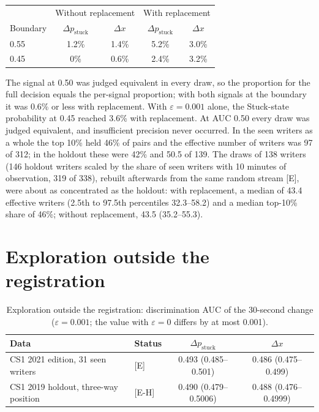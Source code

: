 \begin{center}\small
\begin{tabular}{l c c c c}
  \toprule
  & \multicolumn{2}{c}{Without replacement} & \multicolumn{2}{c}{With replacement} \\
  Boundary & $\Delta p_{\mathrm{stuck}}$ & $\Delta x$ & $\Delta p_{\mathrm{stuck}}$ & $\Delta x$ \\
  \midrule
  0.55 & 1.2\% & 1.4\% & 5.2\% & 3.0\% \\
  0.45 & 0\% & 0.6\% & 2.4\% & 3.2\% \\
  \bottomrule
\end{tabular}
\end{center}

The signal at 0.50 was judged equivalent in every draw, so the proportion for the full decision equals the per-signal
proportion; with both signals at the boundary it was 0.6\% or less with replacement. With $\varepsilon = 0.001$ alone,
the Stuck-state probability at 0.45 reached 3.6\% with replacement. At AUC 0.50 every draw was judged equivalent, and
insufficient precision never occurred. In the seen writers as a whole the top 10\% held 46\% of pairs and the effective number of
writers was 97 of 312; in the holdout these were 42\% and 50.5 of 139. The draws of 138 writers (146 holdout writers scaled by the share of seen writers with 10 minutes of observation,
319 of 338), rebuilt afterwards from
the same random stream [E], were about as concentrated as the holdout: with replacement, a median of 43.4 effective
writers (2.5th to 97.5th percentiles 32.3--58.2) and a median top-10\% share of 46\%; without replacement, 43.5
(35.2--55.3).

\section{Exploration outside the registration}
\label{app:explore}

\begin{table}
  \caption{Exploration outside the registration: discrimination AUC of the 30-second change ($\varepsilon = 0.001$; the
  value with $\varepsilon = 0$ differs by at most 0.001).}
  \label{tab:explore}
  \centering\small
  \begin{tabularx}{\linewidth}{>{\raggedright\arraybackslash}X l c c}
    \toprule
    Data & Status & $\Delta p_{\mathrm{stuck}}$ & $\Delta x$ \\
    \midrule
    CS1 2021 edition, 31 seen writers & [E] & 0.493 (0.485--0.501) & 0.486 (0.475--0.499) \\
    CS1 2019 holdout, three-way position & [E-H] & 0.490 (0.479--0.5006) & 0.488 (0.476--0.4999) \\
    \bottomrule
  \end{tabularx}
\end{table}

